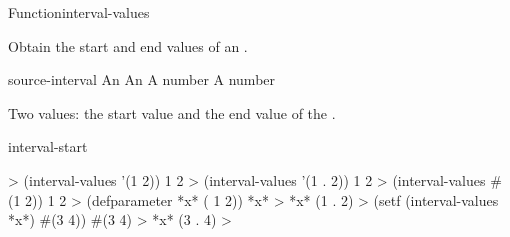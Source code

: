 \documentclass[10pt,twoside,english,pdftex]{article}
\begin{document}
\begin{functiondoc}{Function}{interval-values}%
  { 
    }
%
%
%
%
%
%

\fnsyntax

\fnpurpose Obtain the start and end values of an .

\fnsetf
{}

\fnpackage {}

\fnmodule {}

\fnargs
\begin{args}{source-interval}
\arg[interval] An 
 An 
 A number
 A number
\end{args}

\fnreturns Two values: the start value and the end value of the .

\begin{alsos}{interval-start}
\end{alsos}

\fnexamples
%
%
\W\supp
\begin{example}
  > (interval-values '(1 2))
  1
  2
  > (interval-values '(1 . 2))
  1
  2
  > (interval-values #(1  2))
  1
  2\goodpagebreak
  > (defparameter *x* ( 1 2))
  *x*
  > *x*
  (1 . 2)
  > (setf (interval-values *x*) #(3 4))
  #(3 4)
  > *x*
  (3 . 4)
  >
\end{example}

\end{functiondoc}

\end{document}

